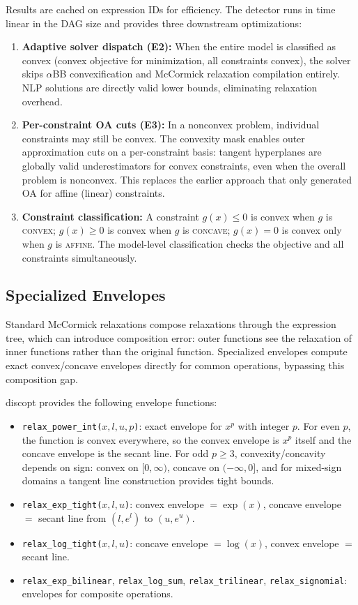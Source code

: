 \documentclass[12pt,preprint]{article}
\begin{document}
Results are cached on expression IDs for efficiency. The detector runs in time linear in the DAG size and provides three downstream optimizations:

\begin{enumerate}
\item \textbf{Adaptive solver dispatch (E2):} When the entire model is classified as convex (convex objective for minimization, all constraints convex), the solver skips $\alpha$BB convexification and McCormick relaxation compilation entirely. NLP solutions are directly valid lower bounds, eliminating relaxation overhead.

\item \textbf{Per-constraint OA cuts (E3):} In a nonconvex problem, individual constraints may still be convex. The convexity mask enables outer approximation cuts \cite{Duran1986} on a per-constraint basis: tangent hyperplanes are globally valid underestimators for convex constraints, even when the overall problem is nonconvex. This replaces the earlier approach that only generated OA for affine (linear) constraints.

\item \textbf{Constraint classification:} A constraint $g(x) \le 0$ is convex when $g$ is \textsc{convex}; $g(x) \ge 0$ is convex when $g$ is \textsc{concave}; $g(x) = 0$ is convex only when $g$ is \textsc{affine}. The model-level classification checks the objective and all constraints simultaneously.
\end{enumerate}

\subsection{Specialized Envelopes}
\label{org-specialized-envelopes}
Standard McCormick relaxations compose relaxations through the expression tree, which can introduce composition error: outer functions see the relaxation of inner functions rather than the original function. Specialized envelopes compute exact convex/concave envelopes directly for common operations, bypassing this composition gap.

discopt provides the following envelope functions:
\begin{itemize}
\item \texttt{relax\_power\_int($x, l, u, p$)}: exact envelope for $x^p$ with integer $p$. For even $p$, the function is convex everywhere, so the convex envelope is $x^p$ itself and the concave envelope is the secant line. For odd $p \ge 3$, convexity/concavity depends on sign: convex on $[0, \infty)$, concave on $(-\infty, 0]$, and for mixed-sign domains a tangent line construction provides tight bounds.
\item \texttt{relax\_exp\_tight($x, l, u$)}: convex envelope $= \exp(x)$, concave envelope $= $ secant line from $(l, e^l)$ to $(u, e^u)$.
\item \texttt{relax\_log\_tight($x, l, u$)}: concave envelope $= \log(x)$, convex envelope $= $ secant line.
\item \texttt{relax\_exp\_bilinear}, \texttt{relax\_log\_sum}, \texttt{relax\_trilinear}, \texttt{relax\_signomial}: envelopes for composite operations.
\end{itemize}
\end{document}
